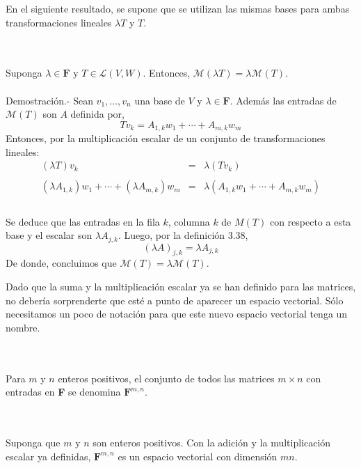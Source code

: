 En el siguiente resultado, se supone que se utilizan las mismas bases para ambas transformaciones lineales $\lambda T$ y $T$.

\begin{myteo}\;\\\\
    Suponga $\lambda \in \textbf{F}$ y $T\in \mathcal{L}(V,W)$. Entonces, $\mathcal{M}(\lambda T)=\lambda \mathcal{M}(T)$.\\\\
	Demostración.-\; Sean $v_1,\ldots, v_n$ una base de $V$ y $\lambda \in \textbf{F}$. Además las entradas de $\mathcal{M}(T)$ son $A$ definida por,
	$$Tv_k=A_{1,k}w_1+\cdots+A_{m,k}w_m$$
	Entonces, por la multiplicación escalar de un conjunto de transformaciones lineales:
	$$
	\begin{array}{rcl}
	(\lambda T)v_k&=& \lambda(Tv_k)\\\\
	\left(\lambda A_{1,k}\right)w_1 + \cdots +\left(\lambda A_{m,k}\right) w_m &=&\lambda\left(A_{1,k}w_1+\cdots +A_{m,k}w_m\right)\\\\
	\end{array}
	$$

	Se deduce que las entradas en la fila $k$, columna $k$ de $M(T)$ con respecto a esta base y el escalar son $\lambda A_{j,k}$. Luego, por la definición 3.38, 
	$$(\lambda A)_{j,k}=\lambda A_{j,k}$$
	De donde, concluimos que $\mathcal{M}(T) =  \lambda \mathcal{M}(T)$.
\end{myteo}

Dado que la suma y la multiplicación escalar ya se han definido para las matrices, no debería sorprenderte que esté a punto de aparecer un espacio vectorial. Sólo necesitamos un poco de notación para que este nuevo espacio vectorial tenga un nombre.

\begin{mydef}\;\\\\
    Para $m$ y $n$ enteros positivos, el conjunto de todos las matrices $m\times n$ con entradas en \textbf{F} se denomina $\textbf{F}^{m,n}$.
\end{mydef}

\begin{myteo}[\boldmath $\dim \textbf{F}^{m,n}=mn$]\,\\\\
    Suponga que $m$ y $n$ son enteros positivos. Con la adición y la multiplicación escalar ya definidas, $\textbf{F}^{m,n}$ es un espacio vectorial con dimensión $mn$.
\end{myteo}



